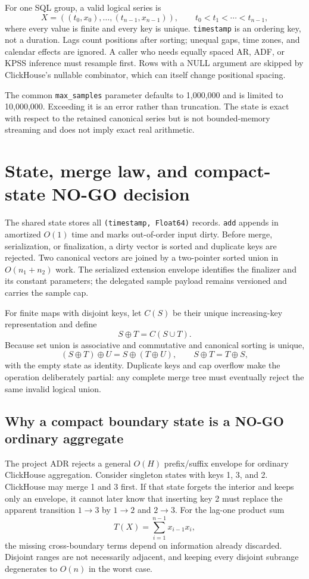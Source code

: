 \documentclass[11pt]{article}
\begin{document}
For one SQL group, a valid logical series is
\[
X=((t_0,x_0),\ldots,(t_{n-1},x_{n-1})),\qquad
t_0<t_1<\cdots<t_{n-1},
\]
where every value is finite and every key is unique. \texttt{timestamp} is an ordering key, not a duration. Lags count positions after sorting; unequal gaps, time zones, and calendar effects are ignored. A caller who needs equally spaced AR, ADF, or KPSS inference must resample first. Rows with a NULL argument are skipped by ClickHouse's nullable combinator, which can itself change positional spacing.

The common \texttt{max\_samples} parameter defaults to 1,000,000 and is limited to 10,000,000. Exceeding it is an error rather than truncation. The state is exact with respect to the retained canonical series but is not bounded-memory streaming and does not imply exact real arithmetic.

\section{State, merge law, and compact-state NO-GO decision}

The shared state stores all \texttt{(timestamp, Float64)} records. \texttt{add} appends in amortized $O(1)$ time and marks out-of-order input dirty. Before merge, serialization, or finalization, a dirty vector is sorted and duplicate keys are rejected. Two canonical vectors are joined by a two-pointer sorted union in $O(n_1+n_2)$ work. The serialized extension envelope identifies the finalizer and its constant parameters; the delegated sample payload remains versioned and carries the sample cap.

For finite maps with disjoint keys, let $C(S)$ be their unique increasing-key representation and define
\[
S\oplus T=C(S\cup T).
\]
Because set union is associative and commutative and canonical sorting is unique,
\[
(S\oplus T)\oplus U=S\oplus(T\oplus U),\qquad
S\oplus T=T\oplus S,
\]
with the empty state as identity. Duplicate keys and cap overflow make the operation deliberately partial: any complete merge tree must eventually reject the same invalid logical union.

\subsection{Why a compact boundary state is a NO-GO ordinary aggregate}

The project ADR rejects a general $O(H)$ prefix/suffix envelope for ordinary ClickHouse aggregation. Consider singleton states with keys 1, 3, and 2. ClickHouse may merge 1 and 3 first. If that state forgets the interior and keeps only an envelope, it cannot later know that inserting key 2 must replace the apparent transition $1\to3$ by $1\to2$ and $2\to3$. For the lag-one product sum
\[
T(X)=\sum_{i=1}^{n-1}x_{i-1}x_i,
\]
the missing cross-boundary terms depend on information already discarded. Disjoint ranges are not necessarily adjacent, and keeping every disjoint subrange degenerates to $O(n)$ in the worst case.
\end{document}
